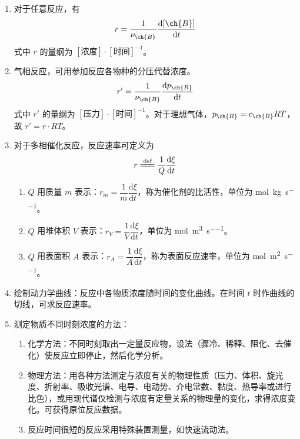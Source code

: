 \begin{enumerate}
    \item 对于任意反应，有
    \begin{equation}
        r = \frac1{\nu_{\ch{B}}} \frac{\mathrm{d}[\ch{B}]}{\mathrm{d}t}
    \end{equation}
    式中 $r$ 的量纲为 $[\text{浓度}] \cdot [\text{时间}]^{-1}$。

    \item 气相反应，可用参加反应各物种的分压代替浓度。
    \begin{equation}
        r' = \frac1{\nu_{\ch{B}}} \frac{\mathrm{d}p_{\ch{B}}}{\mathrm{d}t}
    \end{equation}
    式中 $r'$ 的量纲为 $[\text{压力}] \cdot [\text{时间}]^{-1}$。对于理想气体，$p_{\ch{B}} = c_{\ch{B}} RT$，故 $r' = r \cdot RT$。

    \item 对于多相催化反应，反应速率可定义为
    \begin{equation}
        r \xlongequal{\text{def}} \frac1{Q} \frac{\mathrm{d}\xi}{\mathrm{d}t}
    \end{equation}
    \begin{enumerate}
        \item $Q$ 用质量 $m$ 表示：$r_m = \dfrac1{m} \dfrac{\mathrm{d}\xi}{\mathrm{d}t}$，称为催化剂的比活性，单位为 \si{\mole\per\kilo\gram\per\second}。 \\
        \item $Q$ 用堆体积 $V$ 表示：$r_V = \dfrac1{V} \dfrac{\mathrm{d}\xi}{\mathrm{d}t}$，单位为 \si{\mole\per\meter\cubed\per\second}。 \\
        \item $Q$ 用表面积 $A$ 表示：$r_A = \dfrac1{A} \dfrac{\mathrm{d}\xi}{\mathrm{d}t}$，称为表面反应速率，单位为 \si{\mole\per\meter\squared\per\second}。 \\
    \end{enumerate}

    \item 绘制动力学曲线：反应中各物质浓度随时间的变化曲线。在时间 $t$ 时作曲线的切线，可求反应速率。
    \item 测定物质不同时刻浓度的方法：
    \begin{enumerate}
        \item 化学方法：不同时刻取出一定量反应物，设法（骤冷、稀释、阻化、去催化）使反应立即停止，然后化学分析。
        \item 物理方法：用各种方法测定与浓度有关的物理性质（压力、体积、旋光度、折射率、吸收光谱、电导、电动势、介电常数、黏度、热导率或进行比色），或用现代谱仪检测与浓度有定量关系的物理量的变化，求得浓度变化。可获得原位反应数据。
        \item 反应时间很短的反应采用特殊装置测量，如快速流动法。
    \end{enumerate}
\end{enumerate}
